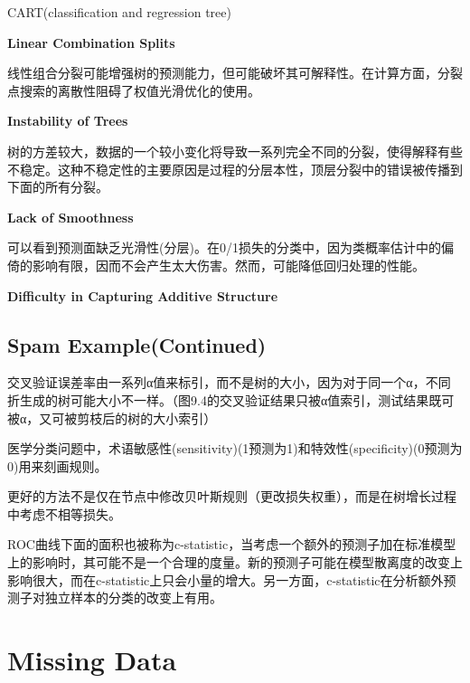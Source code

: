             CART(classification and regression tree)

            {\color{blue} \bf{Linear Combination Splits}}

            线性组合分裂可能增强树的预测能力，但可能破坏其可解释性。在计算方面，分裂点搜索的离散性阻碍了权值光滑优化的使用。

            {\color{blue} \bf{Instability of Trees}}

            树的方差较大，数据的一个较小变化将导致一系列完全不同的分裂，使得解释有些不稳定。这种不稳定性的主要原因是过程的分层本性，顶层分裂中的错误被传播到下面的所有分裂。

            {\color{blue} \bf{Lack of Smoothness}}

            可以看到预测面缺乏光滑性(分层)。在0/1损失的分类中，因为类概率估计中的偏倚的影响有限，因而不会产生太大伤害。然而，可能降低回归处理的性能。

            {\color{blue} \bf{Difficulty in Capturing Additive Structure}}
        \subsection{Spam Example(Continued)}
            交叉验证误差率由一系列α值来标引，而不是树的大小，因为对于同一个α，不同折生成的树可能大小不一样。（图9.4的交叉验证结果只被α值索引，测试结果既可被α，又可被剪枝后的树的大小索引）

            医学分类问题中，术语敏感性(sensitivity)(1预测为1)和特效性(specificity)(0预测为0)用来刻画规则。

            更好的方法不是仅在节点中修改贝叶斯规则（更改损失权重），而是在树增长过程中考虑不相等损失。

            ROC曲线下面的面积也被称为c-statistic，当考虑一个额外的预测子加在标准模型上的影响时，其可能不是一个合理的度量。新的预测子可能在模型散离度的改变上影响很大，而在c-statistic上只会小量的增大。另一方面，c-statistic在分析额外预测子对独立样本的分类的改变上有用。

    \section{Missing Data}
        